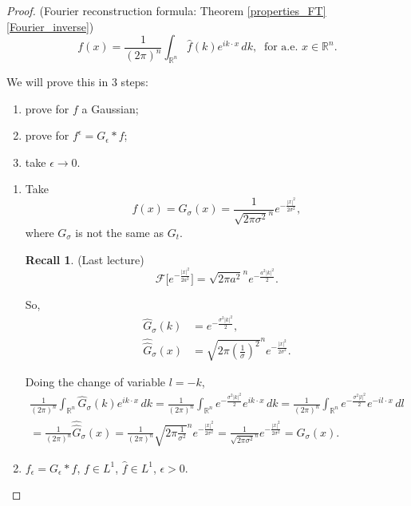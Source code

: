 \documentclass[12pt]{article}
\theoremstyle{definition}
\newtheorem*{recall}{Recall}
\begin{document}
\begin{proof}
(Fourier reconstruction formula: Theorem \ref{properties_FT} \eqref{Fourier_inverse})
\begin{equation}\tag{R}
f(x)=\frac{1}{(2\pi)^n}\int_{\mathbb{R}^n}\hat{f}(k)e^{ik\cdot x}\,dk,\ \text{ for a.e. }x\in\mathbb{R}^n.
\end{equation}

We will prove this in 3 steps:
\begin{enumerate}[label=(\arabic*)]
\item prove for $f$ a Gaussian;
\item prove for $f^{\epsilon}=G_{\epsilon}*f$;
\item take $\epsilon\to0$.
\end{enumerate}

\begin{enumerate}[label=\arabic*.]
\item\label{inverse_Gaussian} Take
\[f(x)=G_{\sigma}(x)=\frac{1}{\sqrt{2\pi\sigma^2}^n}e^{-\frac{|x|^2}{2\sigma^2}},\]
where $G_{\sigma}$ is not the same as $G_t$.

\begin{recall}
(Last lecture)
\[\mathcal{F}\Big[e^{-\frac{|x|^2}{2a^2}}\Big]=\sqrt{2\pi a^2}^ne^{-\frac{a^2|k|^2}{2}}.\]
\end{recall}
So,
\begin{align*}
\widehat{G}_{\sigma}(k)&=e^{-\frac{\sigma^2|k|^2}{2}},\\
\widehat{\widehat{G}}_{\sigma}(x)&=\sqrt{2\pi\left(\frac{1}{\sigma}\right)^2}^ne^{-\frac{|x|^2}{2\sigma^2}}.
\end{align*}

Doing the change of variable $l=-k$,
\begin{multline*}
\frac{1}{(2\pi)^n}\int_{\mathbb{R}^n}\widehat{G}_{\sigma}(k)e^{ik\cdot x}\,dk=\frac{1}{(2\pi)^n}\int_{\mathbb{R}^n}e^{-\frac{\sigma^2|k|^2}{2}}e^{ik\cdot x}\,dk=\frac{1}{(2\pi)^n}\int_{\mathbb{R}^n}e^{-\frac{\sigma^2|l|^2}{2}}e^{-il\cdot x}\,dl\\
=\frac{1}{(2\pi)^n}\widehat{\widehat{G}}_{\sigma}(x)=\frac{1}{(2\pi)^n}\sqrt{2\pi\frac{1}{\sigma^2}}^ne^{-\frac{|x|^2}{2\sigma^2}}=\frac{1}{\sqrt{2\pi\sigma^2}^n}e^{-\frac{|x|^2}{2\sigma^2}}=G_{\sigma}(x).
\end{multline*}

\item\label{inverse_mollified} $f_{\epsilon}=G_{\epsilon}*f$, $f\in L^1$, $\hat{f}\in L^1$, $\epsilon>0$.


\end{enumerate}
\end{proof}
\end{document}
